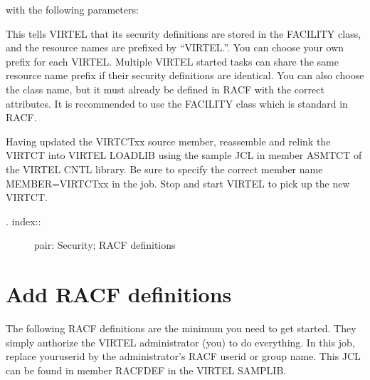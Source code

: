 \documentclass[letterpaper,10pt,english]{sphinxmanual}
\begin{document}
with the following parameters:

\begin{sphinxVerbatim}[commandchars=\\\{\}]
\end{sphinxVerbatim}

This tells VIRTEL that its security definitions are stored in the FACILITY class, and the resource names are prefixed by “VIRTEL.”. You can choose your own prefix for each VIRTEL. Multiple VIRTEL started tasks can share the same resource name prefix if their security definitions are identical. You can also choose the class name, but it must already be defined in RACF with the correct attributes. It is recommended to use the FACILITY class which is standard in RACF.

Having updated the VIRTCTxx source member, reassemble and relink the VIRTCT into VIRTEL LOADLIB using the sample JCL in member ASMTCT of the VIRTEL CNTL library. Be sure to specify the correct member name MEMBER=VIRTCTxx in the job. Stop and start VIRTEL to pick up the new VIRTCT.
\begin{description}
\item[{. index::}] \leavevmode
pair: Security; RACF definitions

\end{description}


\section{Add RACF definitions}
\label{\detokenize{Installation_Guide:add-racf-definitions}}
The following RACF definitions are the minimum you need to get started. They simply authorize the VIRTEL administrator (you) to do everything. In this job, replace youruserid by the administrator’s RACF userid or group name. This JCL can be found in member RACFDEF in the VIRTEL SAMPLIB.
\end{document}
